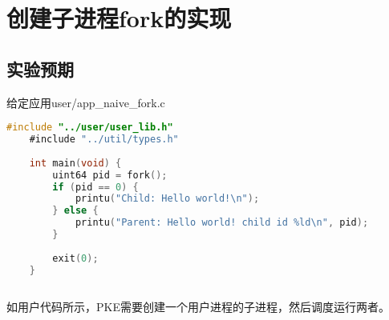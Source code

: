 \section{创建子进程fork的实现}

\subsection{实验预期}

给定应用user/app\_naive\_fork.c

\begin{lstlisting}[caption={用户态应用app\_naive\_fork.c}, label={lst:app_naive_fork}, language=C]
    #include "../user/user_lib.h"
    #include "../util/types.h"
    
    int main(void) {
        uint64 pid = fork();
        if (pid == 0) {
            printu("Child: Hello world!\n");
        } else {
            printu("Parent: Hello world! child id %ld\n", pid);
        }
    
        exit(0);
    }
       
\end{lstlisting}

如用户代码所示，PKE需要创建一个用户进程的子进程，然后调度运行两者。


